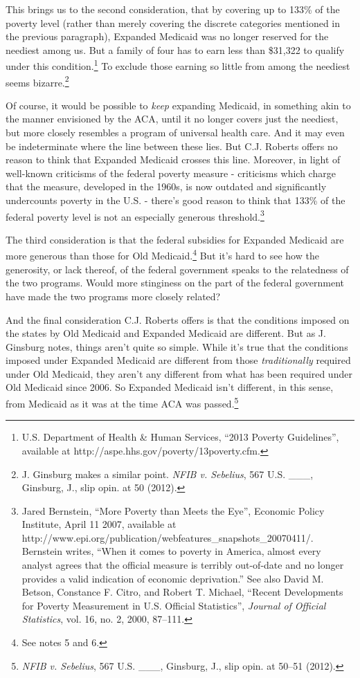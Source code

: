 This brings us to the second consideration, that by covering up to 133\% of the poverty level (rather than merely covering the discrete categories mentioned in the previous paragraph), Expanded Medicaid was no longer reserved for the neediest among us. But a family of four has to earn less than \$31,322 to qualify under this condition.\footnote{U.S. Department of Health \& Human Services, ``2013 Poverty Guidelines'', available at http:/\slash aspe.hhs.gov\slash poverty\slash 13poverty.cfm.} To exclude those earning so little from among the neediest seems bizarre.\footnote{J. Ginsburg makes a similar point. \emph{NFIB v. Sebelius}, 567 U.S. \_\_\_, Ginsburg, J., slip opin. at 50 (2012).}

Of course, it would be possible to \emph{keep} expanding Medicaid, in something akin to the manner envisioned by the ACA, until it no longer covers just the neediest, but more closely resembles a program of universal health care. And it may even be indeterminate where the line between these lies. But C.J. Roberts offers no reason to think that Expanded Medicaid crosses this line. Moreover, in light of well-known criticisms of the federal poverty measure - criticisms which charge that the measure, developed in the 1960s, is now outdated and significantly undercounts poverty in the U.S. - there's good reason to think that 133\% of the federal poverty level is not an especially generous threshold.\footnote{Jared Bernstein, ``More Poverty than Meets the Eye'', Economic Policy Institute, April 11 2007, available at http:/\slash www.epi.org\slash publication\slash webfeatures\_snapshots\_20070411\slash . Bernstein writes, ``When it comes to poverty in America, almost every analyst agrees that the official measure is terribly out-of-date and no longer provides a valid indication of economic deprivation.'' See also David M. Betson, Constance F. Citro, and Robert T. Michael, ``Recent Developments for Poverty Measurement in U.S. Official Statistics'', \emph{Journal of Official Statistics}, vol. 16, no. 2, 2000, 87--111.} 

The third consideration is that the federal subsidies for Expanded Medicaid are more generous than those for Old Medicaid.\footnote{See notes 5 and 6.} But it's hard to see how the generosity, or lack thereof, of the federal government speaks to the relatedness of the two programs. Would more stinginess on the part of the federal government have made the two programs more closely related?

And the final consideration C.J. Roberts offers is that the conditions imposed on the states by Old Medicaid and Expanded Medicaid are different. But as J. Ginsburg notes, things aren't quite so simple. While it's true that the conditions imposed under Expanded Medicaid are different from those \emph{traditionally} required under Old Medicaid, they aren't any different from what has been required under Old Medicaid since 2006. So Expanded Medicaid isn't different, in this sense, from Medicaid as it was at the time ACA was passed.\footnote{\emph{NFIB v. Sebelius}, 567 U.S. \_\_\_, Ginsburg, J., slip opin. at 50--51 (2012).} 


